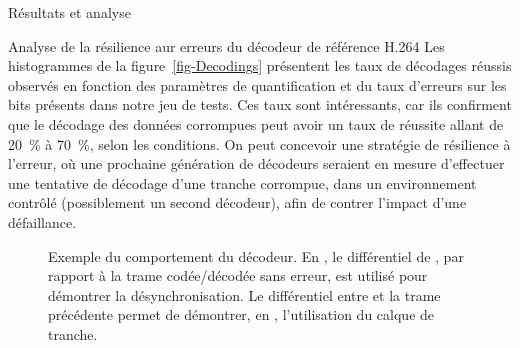 \documentclass[letterpaper, twoside, 12pt,memoire]{thETS}
\newcommand{\fig}[1]{figure~\ref{#1}}
\begin{document}
\begin{chapter}{Résultats et analyse}
\begin{section}{Analyse de la résilience aur erreurs du décodeur de référence H.264}
Les histogrammes de la \fig{fig-Decodings} présentent les taux de décodages
réussis observés en fonction des paramètres de quantification et du taux
d'erreurs sur les bits présents dans notre jeu de tests. Ces taux sont
intéressants, car ils confirment que le décodage des données corrompues peut
avoir un taux de réussite allant de 20~\% à 70~\%, selon les conditions. On peut
concevoir une stratégie de résilience à l'erreur, où une prochaine génération de
décodeurs seraient en mesure d'effectuer une tentative de décodage d'une tranche
corrompue, dans un environnement contrôlé (possiblement un second décodeur),
afin de contrer l'impact d'une défaillance.

\begin{figure}[htb]
\caption{Exemple du comportement du décodeur. En , le
différentiel de , par rapport à la trame codée/décodée
sans erreur, est utilisé pour démontrer la désynchronisation. Le différentiel
entre  et la trame précédente permet de démontrer, en
, l'utilisation du calque de tranche.}
\label{fig-DecoderBehavior}
\end{figure}


\end{section}
\end{chapter}
\end{document}

